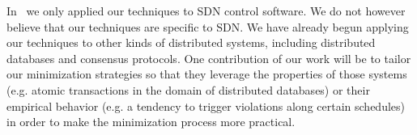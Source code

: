  In~\cite{sts2014} we
only applied our techniques to SDN control software. We do not however believe
that our techniques are specific to SDN. We have already begun applying our
techniques to other kinds of distributed systems, including distributed
databases and consensus protocols. One contribution of our work will be to
tailor our minimization strategies so that they
leverage the properties of those systems (e.g. atomic transactions in the
domain of distributed databases) or their empirical behavior (e.g. a tendency
to trigger violations along certain schedules) in
order to make the minimization process more practical.












